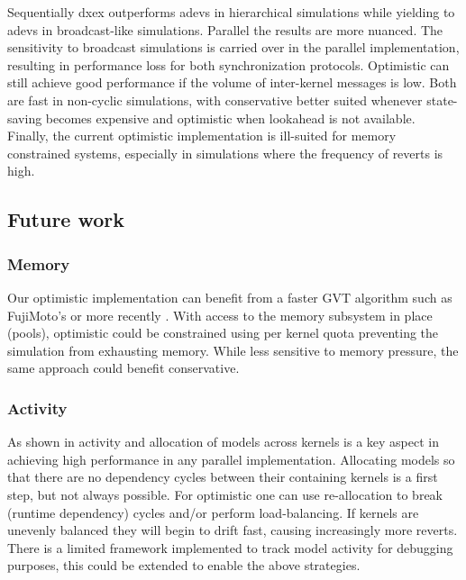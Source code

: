 Sequentially dxex outperforms adevs in hierarchical simulations while yielding to adevs in broadcast-like simulations. 
Parallel the results are more nuanced. The sensitivity to broadcast simulations is carried over in the parallel implementation, resulting in performance loss for both synchronization protocols. Optimistic can still achieve good performance if the volume of inter-kernel messages is low. Both  are fast in non-cyclic simulations, with conservative better suited whenever state-saving becomes expensive and optimistic when lookahead is not available.\\
Finally, the current optimistic implementation is ill-suited for memory constrained systems, especially in simulations where the frequency of reverts is high.
\subsection{Future work}
\subsubsection{Memory}
Our optimistic implementation can benefit from a faster GVT algorithm such as FujiMoto's \cite{Fujimoto:1997:CGV:268403.268404}  or more recently \cite{Bauer:2005:SND:1069810.1070159}. 
With access to the memory subsystem in place (pools), optimistic could be constrained using per kernel quota preventing the simulation from exhausting memory. While less sensitive to memory pressure, the same approach could benefit conservative.
\subsubsection{Activity}
As shown in \cite{PythonPDEVS_ACTIMS} activity and allocation of models across kernels is a key aspect in achieving high performance in any parallel implementation. Allocating models so that there are no dependency cycles between their containing kernels is a first step, but not always possible. For optimistic one can use re-allocation to break (runtime dependency) cycles and/or perform load-balancing. If kernels are unevenly balanced they will begin to drift fast, causing increasingly more reverts. There is a limited framework implemented to track model activity for debugging purposes, this could be extended to enable the above strategies.
